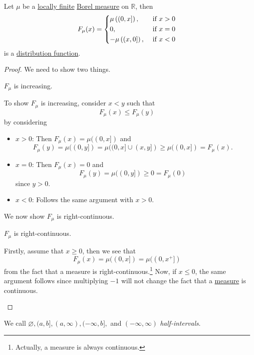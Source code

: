 \begin{lemma}
	Let \(\mu \) be a \hyperref[def:locally-finite]{locally finite} \hyperref[def:Borel-measure]{Borel measure} on \(\mathbb{R} \), then
	\[
		F_{\mu }(x) = \begin{dcases}
			\mu \left((0, x]\right),  & \text{ if } x > 0 \\
			0,                        & \text{ if } x = 0 \\
			-\mu \left((x, 0]\right), & \text{ if } x < 0
		\end{dcases}
	\]
	is a \hyperref[def:distribution-function]{distribution function}.
\end{lemma}
\begin{proof}
	We need to show two things.
	\begin{claim}
		\(F_\mu\) is increasing.
	\end{claim}
	\begin{explanation}
		To show \(F_\mu\) is increasing, consider \(x<y\) such that
		\[
			F_\mu (x) \leq F_\mu (y)
		\]
		by considering
		\begin{itemize}
			\item \(x>0\): Then \(F_\mu (x) = \mu ((0, x])\) and
			      \[
				      F_\mu (y) = \mu ((0, y]) = \mu ((0, x]\cup (x, y]) \geq \mu ((0, x]) = F_\mu (x).
			      \]
			\item \(x=0\): Then \(F_\mu (x) = 0\) and
			      \[
				      F_\mu (y) = \mu ((0, y])\geq 0 = F_\mu (0)
			      \]
			      since \(y>0\).
			\item \(x<0\): Follows the same argument with \(x>0\).
		\end{itemize}
	\end{explanation}

	We now show \(F_\mu \) is right-continuous.
	\begin{claim}
		\(F_\mu \) is right-continuous.
	\end{claim}
	\begin{explanation}
		Firstly, assume that \(x \geq 0\), then we see that
		\[
			F_\mu(x) = \mu ((0, x]) = \mu ((0, x^+])
		\]
		from the fact that a measure is right-continuous.\footnote{Actually, a measure is always continuous.} Now, if \(x\leq 0\), the same argument follows since multiplying \(-1\) will not change the fact that a \hyperref[def:measure]{measure} is continuous.
	\end{explanation}
\end{proof}

\begin{definition}\label{def:half-intervals}
	We call \(\varnothing , (a, b], (a, \infty ), (-\infty , b],\) and \((-\infty , \infty )\) \emph{half-intervals}.
\end{definition}

